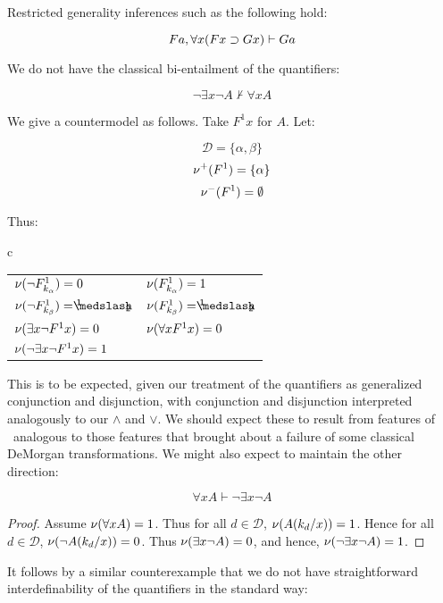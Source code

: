 \noindent Restricted generality inferences such as the following hold:

\[{Fa, \forall x(Fx\supset Gx)}\vdash{Ga}\]

\noindent We do not have the classical bi-entailment of the quantifiers:

\[\neg\exists x\neg A\nvdash\forall xA\]

\noindent We give a countermodel as follows. Take $F^1x$ for $A$. Let:

\begin{singlespace}
$$\mathcal{D}=\{\alpha,\beta\}$$
$$\mathcal{\nu}^+(F^1)=\{\alpha\}$$
$$\mathcal{\nu}^-(F^1)=\emptyset$$
\end{singlespace}

\noindent Thus:

\begin{singlespace}
\begin{longtable}{c}
\begin{tabular}{ll}
$\mathcal{\nu}(\neg F^1_{k_\alpha})=0$ & $\mathcal{\nu}(F^1_{k_\alpha})=1$\\
$\MCnu(\neg F^1_{k_\beta})=\oneHalf$ & $\MCnu(F^1_{k_\beta})=\oneHalf$\\
$\mathcal{\nu}(\exists x\neg F^1x)=0$ & $\mathcal{\nu}(\forall xF^1x)=0 $\\
$\mathcal{\nu}(\neg\exists x\neg F^1x)=1$ & 
\end{tabular}
\end{longtable}
\end{singlespace}

\noindent This is to be expected, given our treatment of the quantifiers as generalized conjunction and disjunction, with conjunction and disjunction interpreted analogously to our $\wedge$ and $\vee$. We should expect these to result from features of \GO\ analogous to those features that brought about a failure of some classical DeMorgan transformations. We might also expect to maintain the other direction:

\vspace*{-14pt}
\[\forall xA\vdash\neg\exists x\neg A\]
\begin{proof}
Assume $\mathcal{\nu}(\forall xA)=1$. Thus for all $d\in\mathcal{D}$, $\mathcal{\nu}(A(k_d/x))=1$. Hence for all $d\in\mathcal{D}$, $\mathcal{\nu}(\neg A(k_d/x))=0$. Thus $\mathcal{\nu}(\exists x\neg A)=0$, and hence, $\mathcal{\nu}(\neg\exists x\neg A)=1$.
\end{proof}

It follows by a similar counterexample that we do not have straightforward interdefinability of the quantifiers in the standard way:

